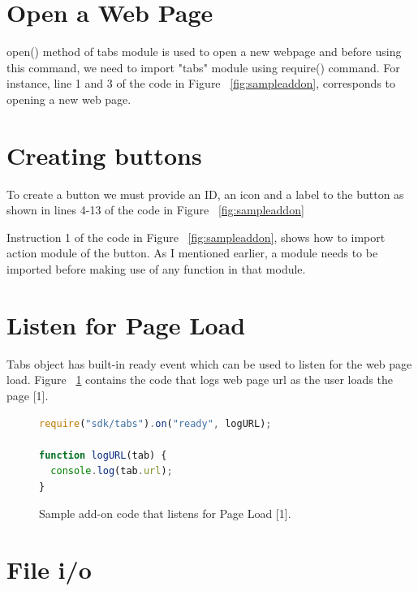 \section{Open a Web Page}

open() method of tabs module is used to open a new webpage and before using this command, we need to import "tabs" module using require() command. For instance, line 1 and 3 of the code in Figure ~\ref{fig:sampleaddon}, corresponds to opening a new web page.

\section{Creating buttons}

To create a button we must provide an ID, an icon and a label to the button as shown in lines 4-13 of the code in Figure ~\ref{fig:sampleaddon}

Instruction 1 of the code in Figure ~\ref{fig:sampleaddon}, shows how to import action module of the button. As I mentioned earlier, a module needs to be imported before making use of any function in that module.

\section{Listen for Page Load}

Tabs object has built-in ready event which can be used to listen for the web page load. Figure ~\ref{fig:pageload} contains the code that logs web page url as the user loads the page [1].
\begin{figure}[h]
  \centering
\begin{lstlisting}[language=JavaScript]
require("sdk/tabs").on("ready", logURL);

function logURL(tab) {
  console.log(tab.url);
}
\end{lstlisting}
    \caption[Add-on code that listens for page load]{Sample add-on code that listens for Page Load [1].}
    \label{fig:pageload}
\end{figure}

\section{File i/o}

